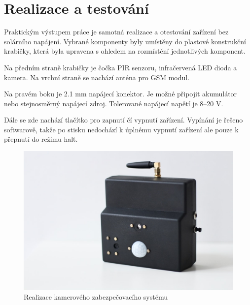 \chapter{Realizace a testování}

Praktickým výstupem práce je samotná realizace a otestování zařízení bez solárního napájení. Vybrané komponenty byly umístěny do plastové konstrukční krabičky, která byla upravena s ohledem na rozmístění jednotlivých komponent.

Na předním straně krabičky je čočka PIR senzoru, infračervená LED dioda a kamera. Na vrchní straně se nachází anténa pro GSM modul. 

Na pravém boku je 2.1 mm napájecí konektor. Je možné připojit akumulátor nebo stejnosměrný napájecí zdroj. Tolerované napájecí napětí je 8--20 V.

Dále se zde nachází tlačítko pro zapnutí čí vypnutí zařízení. Vypínání je řešeno softwarově, takže po stisku nedochází k úplnému vypnutí zařízení ale pouze k přepnutí do režimu halt. 


\begin{figure}[!h]
  \begin{center}
    \includegraphics[scale=0.4]{obrazky/kamera.jpg}
  \end{center}
  \caption{Realizace kamerového zabezpečovacího systému}
\end{figure}


